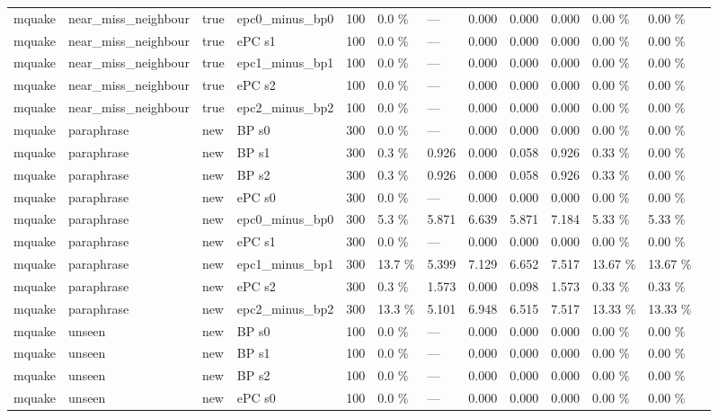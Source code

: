 \documentclass[10pt,a4paper]{article}
\begin{document}
\begin{center}
\begin{tabularx}{\textwidth}{@{}p{}XXXXXXXXXXXX@{}}
mquake & near\_miss\_neighbour & true & epc0\_minus\_bp0 & 100 & 0.0 \% & — & 0.000 & 0.000 & 0.000 & 0.00 \% & 0.00 \% &  \\
mquake & near\_miss\_neighbour & true & ePC s1 & 100 & 0.0 \% & — & 0.000 & 0.000 & 0.000 & 0.00 \% & 0.00 \% &  \\
mquake & near\_miss\_neighbour & true & epc1\_minus\_bp1 & 100 & 0.0 \% & — & 0.000 & 0.000 & 0.000 & 0.00 \% & 0.00 \% &  \\
mquake & near\_miss\_neighbour & true & ePC s2 & 100 & 0.0 \% & — & 0.000 & 0.000 & 0.000 & 0.00 \% & 0.00 \% &  \\
mquake & near\_miss\_neighbour & true & epc2\_minus\_bp2 & 100 & 0.0 \% & — & 0.000 & 0.000 & 0.000 & 0.00 \% & 0.00 \% &  \\
mquake & paraphrase & new & BP s0 & 300 & 0.0 \% & — & 0.000 & 0.000 & 0.000 & 0.00 \% & 0.00 \% &  \\
mquake & paraphrase & new & BP s1 & 300 & 0.3 \% & 0.926 & 0.000 & 0.058 & 0.926 & 0.33 \% & 0.00 \% &  \\
mquake & paraphrase & new & BP s2 & 300 & 0.3 \% & 0.926 & 0.000 & 0.058 & 0.926 & 0.33 \% & 0.00 \% &  \\
mquake & paraphrase & new & ePC s0 & 300 & 0.0 \% & — & 0.000 & 0.000 & 0.000 & 0.00 \% & 0.00 \% &  \\
mquake & paraphrase & new & epc0\_minus\_bp0 & 300 & 5.3 \% & 5.871 & 6.639 & 5.871 & 7.184 & 5.33 \% & 5.33 \% &  \\
mquake & paraphrase & new & ePC s1 & 300 & 0.0 \% & — & 0.000 & 0.000 & 0.000 & 0.00 \% & 0.00 \% &  \\
mquake & paraphrase & new & epc1\_minus\_bp1 & 300 & 13.7 \% & 5.399 & 7.129 & 6.652 & 7.517 & 13.67 \% & 13.67 \% &  \\
mquake & paraphrase & new & ePC s2 & 300 & 0.3 \% & 1.573 & 0.000 & 0.098 & 1.573 & 0.33 \% & 0.33 \% &  \\
mquake & paraphrase & new & epc2\_minus\_bp2 & 300 & 13.3 \% & 5.101 & 6.948 & 6.515 & 7.517 & 13.33 \% & 13.33 \% &  \\
mquake & unseen & new & BP s0 & 100 & 0.0 \% & — & 0.000 & 0.000 & 0.000 & 0.00 \% & 0.00 \% &  \\
mquake & unseen & new & BP s1 & 100 & 0.0 \% & — & 0.000 & 0.000 & 0.000 & 0.00 \% & 0.00 \% &  \\
mquake & unseen & new & BP s2 & 100 & 0.0 \% & — & 0.000 & 0.000 & 0.000 & 0.00 \% & 0.00 \% &  \\
mquake & unseen & new & ePC s0 & 100 & 0.0 \% & — & 0.000 & 0.000 & 0.000 & 0.00 \% & 0.00 \% &  \\

\end{tabularx}
\end{center}
\end{document}
